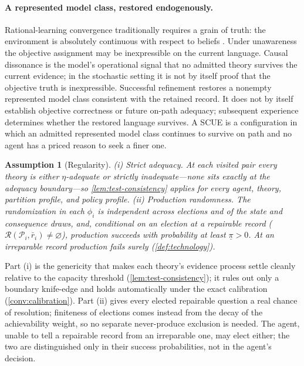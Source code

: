 \documentclass[11pt]{article}
\newtheorem{assumption}{Assumption}[section]
\theoremstyle{definition}
\newcommand{\emptysetset}{\varnothing}
\begin{document}
\paragraph{A represented model class, restored endogenously.}
\label{rem:grain}
Rational-learning convergence traditionally requires a grain of truth: the environment is absolutely continuous with respect to beliefs \citep{KalaiLehrer1993a}.
Under unawareness the objective assignment may be inexpressible on the current language.
Causal dissonance is the model's operational signal that no admitted theory survives the current evidence; in the stochastic setting it is not by itself proof that the objective truth is inexpressible.
Successful refinement restores a nonempty represented model class consistent with the retained record.
It does not by itself establish objective correctness or future on-path adequacy; subsequent experience determines whether the restored language survives.
A SCUE is a configuration in which an admitted represented model class continues to survive on path and no agent has a priced reason to seek a finer one.

\begin{assumption}[Regularity]
\label{ass:regularity}
(i) \emph{Strict adequacy.}
At each visited pair every theory is either $\eta$-adequate or strictly inadequate---none sits exactly at the adequacy boundary---so \cref{lem:test-consistency} applies for every agent, theory, partition profile, and policy profile.
(ii) \emph{Production randomness.}
The randomization in each $\phi_i$ is independent across elections and of the state and consequence draws, and, conditional on an election at a \emph{repairable} record ($\mathcal R(\mathcal P_i,\bar r_i)\neq\emptysetset$), production succeeds with probability at least $\underline\pi>0$.
At an irreparable record production fails surely (\cref{def:technology}).
\end{assumption}

Part (i) is the genericity that makes each theory's evidence process settle cleanly relative to the capacity threshold (\cref{lem:test-consistency}); it rules out only a boundary knife-edge and holds automatically under the exact calibration (\cref{conv:calibration}).
Part (ii) gives every elected repairable question a real chance of resolution; finiteness of elections comes instead from the decay of the achievability weight, so no separate never-produce exclusion is needed.
The agent, unable to tell a repairable record from an irreparable one, may elect either; the two are distinguished only in their success probabilities, not in the agent's decision.
\end{document}
